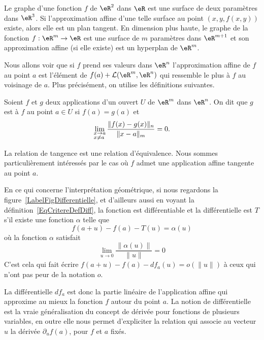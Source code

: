 Le graphe d'une fonction $f$ de $\eR^2$ dans $\eR$ est une surface de deux paramètres dans $\eR^3$. Si l'approximation affine d'une telle surface au point $(x,y,f(x,y))$ existe, alors elle est un plan tangent. En dimension plus haute, le graphe de la fonction $f:\eR^m\to\eR$ est une surface de $m$ paramètres dans $\eR^{m+1}$ et son approximation affine (si elle existe) est un hyperplan de $\eR^m$.

Nous allons voir que si $f$ prend ses valeurs dans $\eR^n$ l'approximation affine de $f$ au point $a$ est l'élément de $ f(a)+\mathcal{L}(\eR^m,\eR^n)$ qui ressemble le plus à $f$ au voisinage de $a$. Plus précisément, on utilise les définitions suivantes.
\begin{definition}
  Soient $f$ et $g$ deux applications d'un ouvert $U$ de $\eR^m$ dans $\eR^n$. On dit que $g$ est  à $f$ au point $a\in U$ si $f(a)=g(a)$ et
\[
\lim_{\begin{subarray}{l}
    x\to a\\ x\neq a
  \end{subarray}}\frac{\|f(x)-g(x)\|_n}{\|x-a\|_m}=0.
\]
\end{definition}
La relation de tangence est une relation d'équivalence. Nous sommes particulièrement intéressés par le cas où $f$ admet une application  affine tangente au point $a$.


\newcommand{\CaptionFigDifferentielle}{Interprétation géométrique de la différentielle.}

En ce qui concerne l'interprétation géométrique, si nous regardons la figure~\ref{LabelFigDifferentielle}, et d'ailleurs aussi en voyant la définition~\ref{EqCritereDefDiff}, la fonction est différentiable et la différentielle est \( T\) s'il existe une fonction \( \alpha\) telle que
\begin{equation}
    f(a+u)-f(a)-T(u)=\alpha(u)
\end{equation}
où la fonction \( \alpha\) satisfait
\begin{equation}		\label{EqPresqueTa}
	\lim_{u\to 0} \frac{ \| \alpha(u)\| }{\| u \|}=0
\end{equation}
C'est cela qui fait écrire \( f(a+u)-f(a)-df_a(u)=o(\| u \|)\) à ceux qui n'ont pas peur de la notation \( o\).

La différentielle $df_a$ est donc la partie linéaire de l'application affine qui approxime au mieux la fonction $f$ autour du point $a$. La notion de différentielle est la vraie généralisation du concept de dérivée pour fonctions de plusieurs variables, en outre elle nous permet d'expliciter la relation qui associe au vecteur $u$ la dérivée $\partial_u f(a)$, pour $f$ et $a$ fixés.

